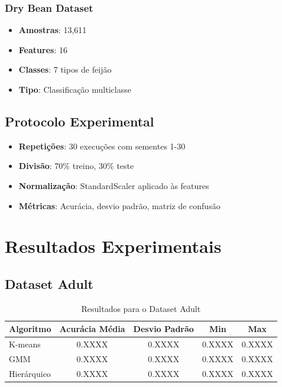 \documentclass[12pt,a4paper]{article}
\begin{document}
\subsubsection{Dry Bean Dataset}
\begin{itemize}
    \item \textbf{Amostras}: 13,611
    \item \textbf{Features}: 16
    \item \textbf{Classes}: 7 tipos de feijão
    \item \textbf{Tipo}: Classificação multiclasse
\end{itemize}

\subsection{Protocolo Experimental}

\begin{itemize}
    \item \textbf{Repetições}: 30 execuções com sementes 1-30
    \item \textbf{Divisão}: 70\% treino, 30\% teste
    \item \textbf{Normalização}: StandardScaler aplicado às features
    \item \textbf{Métricas}: Acurácia, desvio padrão, matriz de confusão
\end{itemize}

\section{Resultados Experimentais}

\subsection{Dataset Adult}

\begin{table}[H]
\centering
\caption{Resultados para o Dataset Adult}
\begin{tabular}{lcccc}
\toprule
\textbf{Algoritmo} & \textbf{Acurácia Média} & \textbf{Desvio Padrão} & \textbf{Min} & \textbf{Max} \\
\midrule
K-means & 0.XXXX & 0.XXXX & 0.XXXX & 0.XXXX \\
GMM & 0.XXXX & 0.XXXX & 0.XXXX & 0.XXXX \\
Hierárquico & 0.XXXX & 0.XXXX & 0.XXXX & 0.XXXX \\
\bottomrule
\end{tabular}
\end{table}
\end{document}
